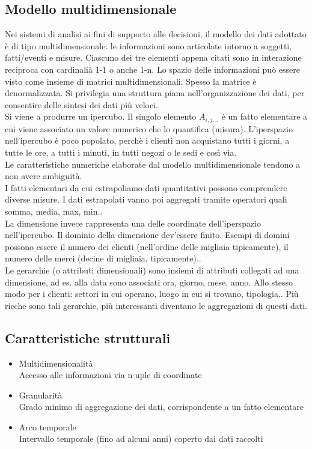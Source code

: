 \subsection{Modello multidimensionale}
\label{sub:Modello multidimensionale}
Nei sistemi di analisi ai fini di supporto alle decisioni, il modello dei dati adottato
\`e di tipo multidimensionale: le informazioni sono articolate intorno a soggetti, fatti/eventi e misure.
Ciascuno dei tre elementi appena citati sono in interazione reciproca con cardinali\`a 1-1 o anche 1-n.
Lo spazio delle informazioni pu\`o essere visto come insieme di matrici multidimensionali.
Spesso la matrice \`e denormalizzata. Si privilegia una struttura piana nell'organizzazione dei dati,
per consentire delle sintesi dei dati pi\`u veloci.\\
Si viene a produrre un ipercubo. Il singolo elemento $A_{i,j,..}$ \`e un fatto elementare a cui viene associato un valore
numerico che lo quantifica (misura).
L'iperspazio nell'ipercubo \`e poco popolato, perch\`e i clienti non acquistano tutti i giorni, a tutte le ore, a tutti i minuti, in tutti negozi o le sedi e cos\`i via.\\
Le caratteristiche numeriche elaborate dal modello multidimensionale
tendono a non avere ambiguit\`a.\\
I fatti elementari da cui estrapoliamo dati quantitativi possono
comprendere diverse misure. I dati estrapolati vanno poi aggregati
tramite operatori quali somma, media, max, min..\\
La dimensione invece rappresenta una delle coordinate dell'iperspazio
nell'iper\-cubo. Il dominio della dimensione dev'essere finito. Esempi di domini possono essere il
numero dei clienti (nell'ordine delle migliaia tipicamente), il numero
delle merci (decine di migliaia, tipicamente)..\\
Le gerarchie (o attributi dimensionali) sono insiemi di attributi
collegati ad una dimensione, ad es. alla data sono associati ora,
giorno, mese, anno. Allo stesso modo per i clienti: settori in cui
operano, luogo in cui si trovano, tipologia.. Pi\`u ricche sono tali
gerarchie, pi\`u interessanti diventano le aggregazioni di questi dati.

\subsection{Caratteristiche
strutturali}\label{caratteristiche-strutturali}

\begin{itemize}

\item
  Multidimensionalit\`a\\
  Accesso alle informazioni via n-uple di coordinate
\item
  Granularit\`a\\
  Grado minimo di aggregazione dei dati, corrispondente a un fatto
  elementare
\item
  Arco temporale\\
  Intervallo temporale (fino ad alcuni anni) coperto dai dati raccolti
\end{itemize}

